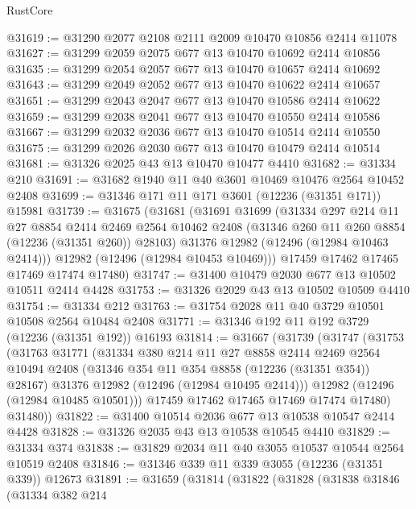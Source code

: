 \begin{lexlean}{RustCore}
\begin{coremodule}
@31619 := @31290 @2077 @2108 @2111 @2009 @10470 @10856 @2414 @11078
@31627 := @31299 @2059 @2075 @677 @13 @10470 @10692 @2414 @10856
@31635 := @31299 @2054 @2057 @677 @13 @10470 @10657 @2414 @10692
@31643 := @31299 @2049 @2052 @677 @13 @10470 @10622 @2414 @10657
@31651 := @31299 @2043 @2047 @677 @13 @10470 @10586 @2414 @10622
@31659 := @31299 @2038 @2041 @677 @13 @10470 @10550 @2414 @10586
@31667 := @31299 @2032 @2036 @677 @13 @10470 @10514 @2414 @10550
@31675 := @31299 @2026 @2030 @677 @13 @10470 @10479 @2414 @10514
@31681 := @31326 @2025 @43 @13 @10470 @10477 @4410
@31682 := @31334 @210
@31691 := @31682 @1940 @11 @40 @3601 @10469 @10476 @2564 @10452 @2408
@31699 := @31346 @171 @11 @171 @3601 (@12236 (@31351 @171)) @15981
@31739 := @31675
    (@31681
      (@31691
        @31699
        (@31334
          @297
          @214
          @11
          @27
          @8854
          @2414
          @2469
          @2564
          @10462
          @2408
          (@31346 @260 @11 @260 @8854 (@12236 (@31351 @260)) @28103)
          @31376
          @12982
          (@12496 (@12984 @10463 @2414)))
        @12982
        (@12496 (@12984 @10453 @10469)))
      @17459
      @17462
      @17465
      @17469
      @17474
      @17480)
@31747 := @31400 @10479 @2030 @677 @13 @10502 @10511 @2414 @4428
@31753 := @31326 @2029 @43 @13 @10502 @10509 @4410
@31754 := @31334 @212
@31763 := @31754 @2028 @11 @40 @3729 @10501 @10508 @2564 @10484 @2408
@31771 := @31346 @192 @11 @192 @3729 (@12236 (@31351 @192)) @16193
@31814 := @31667
    (@31739
      (@31747
        (@31753
          (@31763
            @31771
            (@31334
              @380
              @214
              @11
              @27
              @8858
              @2414
              @2469
              @2564
              @10494
              @2408
              (@31346 @354 @11 @354 @8858 (@12236 (@31351 @354)) @28167)
              @31376
              @12982
              (@12496 (@12984 @10495 @2414)))
            @12982
            (@12496 (@12984 @10485 @10501)))
          @17459
          @17462
          @17465
          @17469
          @17474
          @17480)
        @31480))
@31822 := @31400 @10514 @2036 @677 @13 @10538 @10547 @2414 @4428
@31828 := @31326 @2035 @43 @13 @10538 @10545 @4410
@31829 := @31334 @374
@31838 := @31829 @2034 @11 @40 @3055 @10537 @10544 @2564 @10519 @2408
@31846 := @31346 @339 @11 @339 @3055 (@12236 (@31351 @339)) @12673
@31891 := @31659
    (@31814
      (@31822
        (@31828
          (@31838
            @31846
            (@31334
              @382
              @214

\end{coremodule}
\end{lexlean}
